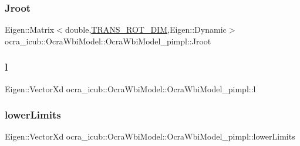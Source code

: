 \hypertarget{structOcraWbiModel_1_1OcraWbiModel__pimpl_a4a70bcc50b618443daf9fed6f5303403}{}\label{structOcraWbiModel_1_1OcraWbiModel__pimpl_a4a70bcc50b618443daf9fed6f5303403} 
\subsubsection{\texorpdfstring{Jroot}{Jroot}}
{\footnotesize\ttfamily Eigen\+::\+Matrix$<$double,\hyperlink{OcraWbiModel_8cpp_ab4a87cb824ceff256c6b8bce7701af58}{T\+R\+A\+N\+S\+\_\+\+R\+O\+T\+\_\+\+D\+IM},Eigen\+::\+Dynamic$>$ ocra\+\_\+icub\+::\+Ocra\+Wbi\+Model\+::\+Ocra\+Wbi\+Model\+\_\+pimpl\+::\+Jroot}

\hypertarget{structOcraWbiModel_1_1OcraWbiModel__pimpl_acc77ea549dd56164264c9436d8188b50}{}\label{structOcraWbiModel_1_1OcraWbiModel__pimpl_acc77ea549dd56164264c9436d8188b50} 
\subsubsection{\texorpdfstring{l}{l}}
{\footnotesize\ttfamily Eigen\+::\+Vector\+Xd ocra\+\_\+icub\+::\+Ocra\+Wbi\+Model\+::\+Ocra\+Wbi\+Model\+\_\+pimpl\+::l}

\hypertarget{structOcraWbiModel_1_1OcraWbiModel__pimpl_aafa8af9a88392dbb874459894cbf181a}{}\label{structOcraWbiModel_1_1OcraWbiModel__pimpl_aafa8af9a88392dbb874459894cbf181a} 
\subsubsection{\texorpdfstring{lower\+Limits}{lowerLimits}}
{\footnotesize\ttfamily Eigen\+::\+Vector\+Xd ocra\+\_\+icub\+::\+Ocra\+Wbi\+Model\+::\+Ocra\+Wbi\+Model\+\_\+pimpl\+::lower\+Limits}

\hypertarget{structOcraWbiModel_1_1OcraWbiModel__pimpl_a56b6cb4adf9dead06b4d09fe38daa26e}{}\label{structOcraWbiModel_1_1OcraWbiModel__pimpl_a56b6cb4adf9dead06b4d09fe38daa26e} 
